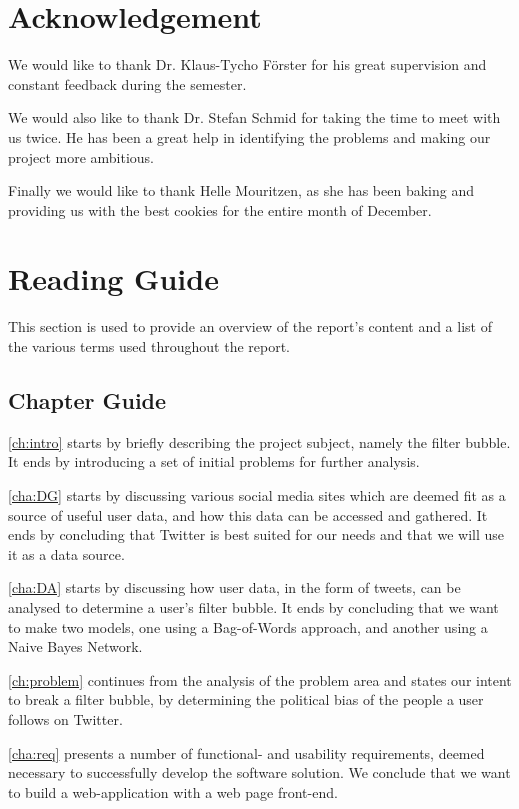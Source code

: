 \section*{Acknowledgement}
We would like to thank Dr. Klaus-Tycho Förster for his great supervision
and constant feedback during the semester.\nl

We would also like to thank Dr. Stefan Schmid for taking the time to meet with
us twice. He has been a great help in identifying the problems and making our
project more ambitious.\nl

Finally we would like to thank Helle Mouritzen, as she has been
baking and providing us with the best cookies for the entire month of
December.\newpage


\section{Reading Guide}\label{sec:readingGuide}
This section is used to provide an overview of the report's content and a list
of the various terms used throughout the report.

\subsection{Chapter Guide}
\autoref{ch:intro} starts by briefly describing the project subject, namely  the
filter bubble. It ends by introducing a set of initial problems for further
analysis.\nl

\autoref{cha:DG} starts by discussing various social media sites which are
deemed fit as a source of useful user data, and how this data can be
accessed and gathered. It ends by concluding that Twitter is best suited for our
needs and that we will use it as a data source.\nl

\autoref{cha:DA} starts by discussing how user data, in the form of tweets, can
be analysed to determine a user's filter bubble. It ends by concluding
that we want to make two models, one using a Bag-of-Words approach, and another
using a Naive Bayes Network.\nl

\autoref{ch:problem} continues from the analysis of the problem area and states
our intent to break a filter bubble, by determining the political bias of the
people a user follows on Twitter.\nl

\autoref{cha:req} presents a number of functional- and usability requirements,
deemed necessary to successfully develop the software solution. We conclude that
we want to build a web-application with a web page front-end.\nl

